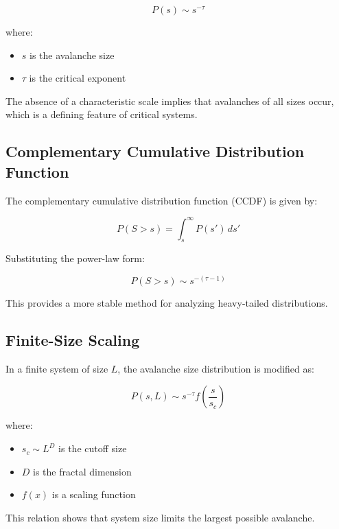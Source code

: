 \documentclass[12pt,a4paper]{article}
\begin{document}
\begin{equation}
P(s) \sim s^{-\tau}
\end{equation}

where:
\begin{itemize}
\item $s$ is the avalanche size
\item $\tau$ is the critical exponent
\end{itemize}

The absence of a characteristic scale implies that avalanches of all sizes occur, which is a defining feature of critical systems.

\subsection{Complementary Cumulative Distribution Function}

The complementary cumulative distribution function (CCDF) is given by:

\begin{equation}
P(S > s) = \int_s^{\infty} P(s') \, ds'
\end{equation}

Substituting the power-law form:

\begin{equation}
P(S > s) \sim s^{-(\tau - 1)}
\end{equation}

This provides a more stable method for analyzing heavy-tailed distributions.

\subsection{Finite-Size Scaling}

In a finite system of size $L$, the avalanche size distribution is modified as:

\begin{equation}
P(s, L) \sim s^{-\tau} f\left(\frac{s}{s_c}\right)
\end{equation}

where:
\begin{itemize}
\item $s_c \sim L^D$ is the cutoff size
\item $D$ is the fractal dimension
\item $f(x)$ is a scaling function
\end{itemize}

This relation shows that system size limits the largest possible avalanche.
\end{document}

